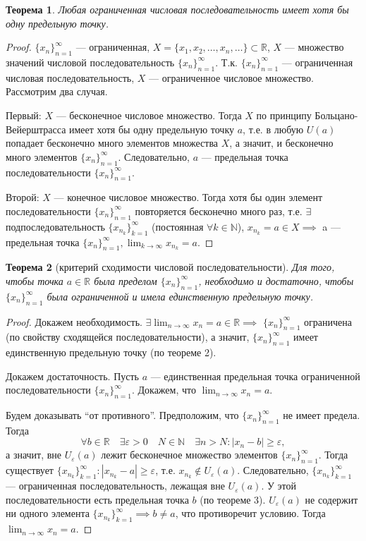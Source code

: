 \documentclass[a4paper,12pt]{article} %
\newtheorem{theorem}{Теорема}[section]
\theoremstyle{remark}
\theoremstyle{definition}
\begin{document}
\begin{theorem}
	Любая ограниченная числовая последовательность имеет хотя бы одну предельную точку.
\end{theorem}
\begin{proof}
	$\{x_n\}_{n=1}^{\infty}$ --- ограниченная, $X = \{x_1, x_2, \ldots, x_n, \ldots\} \subset \mathbb{R}$, $X$ --- множество значений числовой последовательность $\{x_n\}_{n=1}^{\infty}$. Т.к. $\{x_n\}_{n=1}^{\infty}$ --- ограниченная числовая последовательность, $X$ --- ограниченное числовое множество.
	Рассмотрим два случая.

	Первый: $X$ --- бесконечное числовое множество. Тогда $X$ по принципу Больцано-Вейерштрасса имеет хотя бы одну предельную точку $a$, т.е. в любую $U(a)$ попадает бесконечно много элементов множества $X$, а значит, и бесконечно много элементов $\{x_n\}_{n=1}^{\infty}$. Следовательно, $a$ --- предельная точка последовательности $\{x_n\}_{n=1}^{\infty}$.

	Второй: $X$ --- конечное числовое множество. Тогда хотя бы один элемент последовательности $\{x_n\}_{n=1}^{\infty}$ повторяется бесконечно много раз, т.е. $\exists$ подпоследовательность $\{x_{n_k}\}_{k=1}^{\infty}$ (постоянная $\forall k\in \mathbb{N}$), $x_{n_k} = a\in  X \implies$ a --- предельная точка $\{x_n\}_{n=1}^{\infty}, \lim_{k \to \infty} x_{n_k} = a$.
\end{proof}

\begin{theorem}[критерий сходимости числовой последовательности]
	Для того, чтобы точка $a\in \mathbb{R}$ была пределом $\{x_n\}_{n=1}^{\infty}$, необходимо и достаточно, чтобы $\{x_n\}_{n=1}^{\infty}$ была ограниченной и имела единственную предельную точку.
\end{theorem}
\begin{proof}
	Докажем необходимость.
	$\exists \lim_{n \to \infty} x_n = a \in \mathbb{R} \implies$ $\{x_n\}_{n=1}^{\infty}$ ограничена (по свойству сходящейся последовательности), а значит, $\{x_n\}_{n=1}^{\infty}$ имеет единственную предельную точку (по теореме 2).
	
	Докажем достаточность. Пусть $a$ --- единственная предельная точка ограниченной последовательности $\{x_n\}_{n=1}^{\infty}$. Докажем, что $\lim_{n \to \infty} x_n = a$.

	Будем доказывать ``от противного''. Предположим, что $\{x_n\}_{n=1}^{\infty}$ не имеет предела. Тогда
	\[
	\forall b\in \mathbb{R} \quad \exists \varepsilon>0 \quad N\in \mathbb{N} \quad \exists n>N : |x_n - b| \ge \varepsilon
	,\] 
	а значит, вне $U_\varepsilon(a)$ лежит бесконечное множество элементов $\{x_n\}_{n=1}^{\infty}$. Тогда существует $\{x_{n_k}\}_{k=1}^{\infty} : |x_{n_k} - a| \ge \varepsilon$, т.е. $x_{n_k}\not\in U_\varepsilon(a)$. Следовательно, $\{x_{n_k}\}_{k=1}^{\infty}$ --- ограниченная последовательность, лежащая вне $U_\varepsilon(a)$. У этой последовательности есть предельная точка $b$ (по теореме 3). $U_\varepsilon(a)$ не содержит ни одного элемента $\{x_{n_k}\}_{k=1}^{\infty} \implies b\neq a$, что противоречит условию. Тогда $\lim_{n \to \infty} x_n = a$.
\end{proof}
\end{document}
